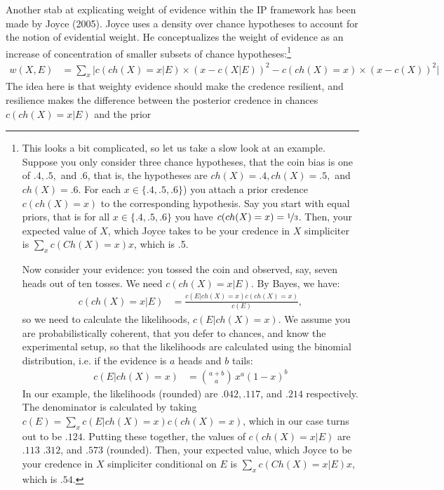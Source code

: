 \documentclass[
  10pt,
  dvipsnames,enabledeprecatedfontcommands]{scrartcl}
\begin{document}
Another stab at explicating weight of evidence within the \textsf{IP}
framework has been made by Joyce (2005). Joyce uses a density over
chance hypotheses to account for the notion of evidential weight. He
conceptualizes the weight of evidence as an increase of concentration of
smaller subsets of chance
hypotheses:\footnote{This looks a bit complicated, so let us take a  slow look at an example. Suppose you only consider three chance hypotheses, that the coin bias is one of $.4, .5,$ and $.6$, that is, the hypotheses are $ch(X) = .4, ch(X)=.5,$ and $ch(X)=.6$. For each $x\in \{.4, .5, .6\}$) you attach a prior credence  $c(ch(X) = x)$ to the corresponding hypothesis. Say you start with equal priors, that is for all $x\in \{.4, .5, .6\}$ you have $c(ch(X) =x) = \nicefrac{1}{3}$. Then, your expected value of $X$, which Joyce takes to be your credence in $X$ simpliciter is $\sum_x c(Ch(X)=x)x$, which is .5. 


Now consider your evidence: you tossed the coin and observed, say, seven heads out of ten tosses. We need $c(ch(X)=x \vert E)$. By Bayes, we have:
\begin{align*}
c(ch(X)=x \vert E) & = \frac{c(E \vert ch(X) =x) c(ch(X)=x )}{c(E)},
\end{align*}
\noindent so we need to calculate the likelihoods, $c(E \vert ch(X) =x)$. We assume you are probabilistically coherent, that you defer to chances, and know the experimental setup, so that the likelihoods are calculated using the binomial distribution, i.e. if the evidence is $a$ heads and $b$ tails: 
\begin{align*}
c(E \vert ch(X) =x) & = {a+b \choose a}\,x ^a (1-x)^{b}
\end{align*}
\noindent In our example, the likelihoods (rounded) are $.042, .117$, and $.214$ respectively. The denominator is calculated by taking $c(E) =  \sum_x c(E \vert ch(X) =x) c(ch(X)=x)$, which in our case turns out to be $.124$. Putting these together, the values of $c(ch(X)=x \vert E)$ are $.113$ $.312$, and  $.573$ (rounded). Then, your expected value, which Joyce to be your credence in $X$ simpliciter conditional on $E$ is $\sum_x c(Ch(X)=x\vert E)x$, which is  $.54$.}
\begin{align}
\tag{Joyce} w(X,E) & = \sum_x \vert c(ch(X) = x  \vert E) \times (x - c(X\vert E))^2 - c(ch(X) = x) \times (x - c(X))^2\vert
\end{align} The idea here is that weighty evidence should make the
credence resilient, and resilience makes the difference between the
posterior credence in chances \(c(ch(X)=x \vert E)\) and the prior
\end{document}
